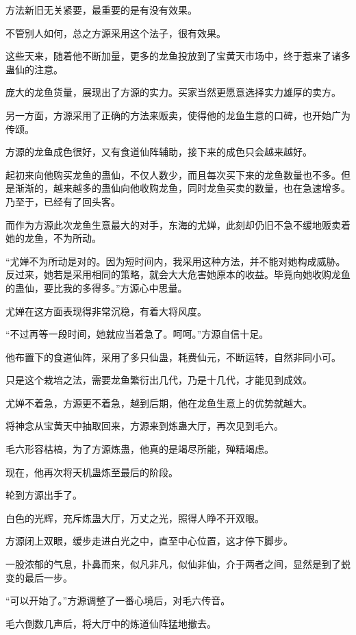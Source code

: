 \begin{this_body}
方法新旧无关紧要，最重要的是有没有效果。

不管别人如何，总之方源采用这个法子，很有效果。

这些天来，随着他不断加量，更多的龙鱼投放到了宝黄天市场中，终于惹来了诸多蛊仙的注意。

庞大的龙鱼货量，展现出了方源的实力。买家当然更愿意选择实力雄厚的卖方。

另一方面，方源采用了正确的方法来贩卖，使得他的龙鱼生意的口碑，也开始广为传颂。

方源的龙鱼成色很好，又有食道仙阵辅助，接下来的成色只会越来越好。

起初来向他购买龙鱼的蛊仙，不仅人数少，而且每次买下来的龙鱼数量也不多。但是渐渐的，越来越多的蛊仙向他收购龙鱼，同时龙鱼买卖的数量，也在急速增多。乃至于，已经有了回头客。

而作为方源此次龙鱼生意最大的对手，东海的尤婵，此刻却仍旧不急不缓地贩卖着她的龙鱼，不为所动。

“尤婵不为所动是对的。因为短时间内，我采用这种方法，并不能对她构成威胁。反过来，她若是采用相同的策略，就会大大危害她原本的收益。毕竟向她收购龙鱼的蛊仙，要比我的多得多。”方源心中思量。

尤婵在这方面表现得非常沉稳，有着大将风度。

“不过再等一段时间，她就应当着急了。呵呵。”方源自信十足。

他布置下的食道仙阵，采用了多只仙蛊，耗费仙元，不断运转，自然非同小可。

只是这个栽培之法，需要龙鱼繁衍出几代，乃是十几代，才能见到成效。

尤婵不着急，方源更不着急，越到后期，他在龙鱼生意上的优势就越大。

将神念从宝黄天中抽取回来，方源来到炼蛊大厅，再次见到毛六。

毛六形容枯槁，为了方源炼蛊，他真的是竭尽所能，殚精竭虑。

现在，他再次将天机蛊炼至最后的阶段。

轮到方源出手了。

白色的光辉，充斥炼蛊大厅，万丈之光，照得人睁不开双眼。

方源闭上双眼，缓步走进白光之中，直至中心位置，这才停下脚步。

一股浓郁的气息，扑鼻而来，似凡非凡，似仙非仙，介于两者之间，显然是到了蜕变的最后一步。

“可以开始了。”方源调整了一番心境后，对毛六传音。

毛六倒数几声后，将大厅中的炼道仙阵猛地撤去。


\end{this_body}
